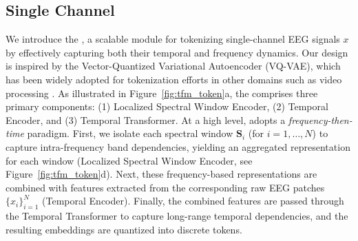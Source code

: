 \subsection{Single Channel \tokenizer}
\label{sec:tfm_tokenizer}
We introduce the \tokenizer, a scalable module for tokenizing single-channel EEG signals 
$x$ by effectively capturing both their temporal and frequency dynamics. Our design is inspired by the Vector-Quantized Variational Autoencoder (VQ-VAE)\cite{van2017neural}, which has been widely adopted for tokenization efforts in other domains such as video processing \cite{agarwal2025cosmos}. As illustrated in Figure~\ref{fig:tfm_token}a, the \tokenizer comprises three primary components: (1) Localized Spectral Window Encoder, (2) Temporal Encoder, and (3) Temporal Transformer. At a high level, \tokenizer adopts a \emph{frequency-then-time} paradigm. First, we isolate each spectral window $\mathbf{S}_i$ (for $i=1,…, N$) to capture intra-frequency band dependencies, yielding an aggregated representation for each window (Localized Spectral Window Encoder, see Figure~\ref{fig:tfm_token}d). Next, these frequency-based representations are combined with features extracted from the corresponding raw EEG patches $\{x_i\}_{i=1}^N$ (Temporal Encoder). Finally, the combined features are passed through the Temporal Transformer to capture long-range temporal dependencies, and the resulting embeddings are quantized into discrete tokens.




